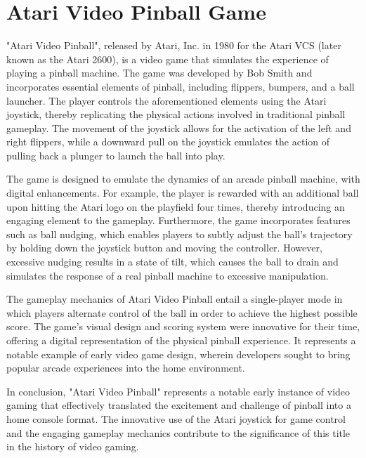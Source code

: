\documentclass[twocolumn]{webofc}
\begin{document}
\section{Atari Video Pinball Game}

"Atari Video Pinball", released by Atari, Inc. in 1980 for the Atari VCS (later known as the Atari 2600), is a video game that simulates the experience of playing a pinball machine. The game was developed by Bob Smith and incorporates essential elements of pinball, including flippers, bumpers, and a ball launcher. The player controls the aforementioned elements using the Atari joystick, thereby replicating the physical actions involved in traditional pinball gameplay. The movement of the joystick allows for the activation of the left and right flippers, while a downward pull on the joystick emulates the action of pulling back a plunger to launch the ball into play. \cite{newman2018atari}

The game is designed to emulate the dynamics of an arcade pinball machine, with digital enhancements. For example, the player is rewarded with an additional ball upon hitting the Atari logo on the playfield four times, thereby introducing an engaging element to the gameplay. Furthermore, the game incorporates features such as ball nudging, which enables players to subtly adjust the ball’s trajectory by holding down the joystick button and moving the controller. However, excessive nudging results in a state of tilt, which causes the ball to drain and simulates the response of a real pinball machine to excessive manipulation. \cite{newman2018atari}

The gameplay mechanics of Atari Video Pinball entail a single-player mode in which players alternate control of the ball in order to achieve the highest possible score. The game's visual design and scoring system were innovative for their time, offering a digital representation of the physical pinball experience. It represents a notable example of early video game design, wherein developers sought to bring popular arcade experiences into the home environment. \cite{newman2018atari}

In conclusion, "Atari Video Pinball" represents a notable early instance of video gaming that effectively translated the excitement and challenge of pinball into a home console format. The innovative use of the Atari joystick for game control and the engaging gameplay mechanics contribute to the significance of this title in the history of video gaming. \cite{newman2018atari}
\end{document}
